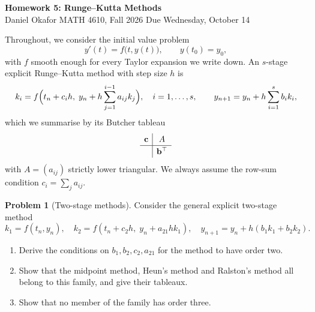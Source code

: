 \documentclass[11pt]{article}
\theoremstyle{definition}
\newtheorem{problem}{Problem}
\begin{document}
\begin{center}
  {\Large\bfseries Homework 5: Runge--Kutta Methods}\\[6pt]
  Daniel Okafor \quad\textbullet\quad MATH 4610, Fall 2026 \quad\textbullet\quad Due Wednesday, October 14
\end{center}

\noindent Throughout, we consider the initial value problem
\begin{equation}\label{eq:ivp}
  y'(t) = f\bigl(t, y(t)\bigr), \qquad y(t_0) = y_0,
\end{equation}
with $f$ smooth enough for every Taylor expansion we write down. An
$s$-stage explicit Runge--Kutta method with step size $h$ is
\begin{equation}\label{eq:rk}
  k_i = f\Bigl(t_n + c_i h,\; y_n + h\sum_{j=1}^{i-1} a_{ij} k_j\Bigr),
  \quad i = 1,\dots,s, \qquad
  y_{n+1} = y_n + h \sum_{i=1}^{s} b_i k_i,
\end{equation}
which we summarise by its Butcher tableau
\[
  \renewcommand{\arraystretch}{1.2}
  \begin{array}{c|c}
    \mathbf{c} & A \\ \hline
               & \mathbf{b}^{\top}
  \end{array}
\]
with $A = (a_{ij})$ strictly lower triangular. We always assume the row-sum
condition $c_i = \sum_j a_{ij}$.

\begin{problem}[Two-stage methods]\label{prob:two-stage}
Consider the general explicit two-stage method
\[
  k_1 = f(t_n, y_n), \quad
  k_2 = f(t_n + c_2 h,\; y_n + a_{21} h k_1), \quad
  y_{n+1} = y_n + h(b_1 k_1 + b_2 k_2).
\]
\begin{enumerate}[label=(\alph*)]
  \item Derive the conditions on $b_1, b_2, c_2, a_{21}$ for the method to have order two.
  \item Show that the midpoint method, Heun's method and Ralston's method all belong to this family, and give their tableaux.
  \item Show that no member of the family has order three.
\end{enumerate}
\end{problem}
\end{document}
